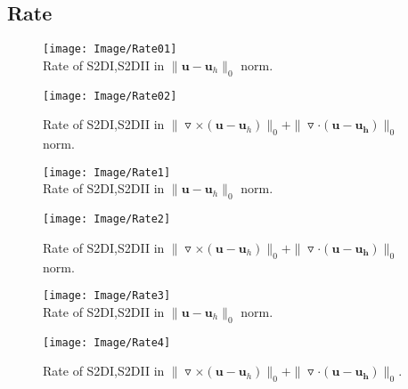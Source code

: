\documentclass[a4paper,11pt]{article}
\begin{document}
\subsection{Rate}
\begin{figure}[bhpt]
  \hspace{35.pt}
  \begin{minipage}[t]{0.4 \textwidth}
    \centering
    \texttt{[image: Image/Rate01]}\\
    \caption{Rate of S2DI,S2DII in $\|\mathbf{u} - \mathbf{u}_h\|_0$ norm.}\label{fig:fig_Rate01}
  \end{minipage}
  \hspace{0.3in}
  \begin{minipage}[t]{0.4 \textwidth}
    \centering
    \texttt{[image: Image/Rate02]}\\
    \caption{Rate of S2DI,S2DII in $\|\triangledown\times(\mathbf{u} - \mathbf{u}_h)\|_0 + \|\triangledown\cdot(\mathbf{u} - \mathbf{u_h})\|_0$ norm.} \label{fig:fig_Rate02}
  \end{minipage}
\end{figure}
\begin{figure}[bhpt]
  \hspace{35.pt}
  \begin{minipage}[t]{0.4 \textwidth}
    \centering
    \texttt{[image: Image/Rate1]}\\
    \caption{Rate of S2DI,S2DII in $\|\mathbf{u} - \mathbf{u}_h\|_0$ norm.}\label{fig:fig_Rate1}
  \end{minipage}
  \hspace{0.3in}
  \begin{minipage}[t]{0.4 \textwidth}
    \centering
    \texttt{[image: Image/Rate2]}\\
    \caption{Rate of S2DI,S2DII in $\|\triangledown\times(\mathbf{u} - \mathbf{u}_h)\|_0 + \|\triangledown\cdot(\mathbf{u} - \mathbf{u_h})\|_0$ norm.} \label{fig:fig_Rate2}
  \end{minipage}
\end{figure}
\begin{figure}[bhpt]
  \hspace{35.pt}
  \begin{minipage}[t]{0.4 \textwidth}
    \centering
    \texttt{[image: Image/Rate3]}\\
    \caption{Rate of S2DI,S2DII in $\|\mathbf{u} - \mathbf{u}_h\|_0$ norm.}\label{fig:fig_Rate3}
  \end{minipage}
  \hspace{0.3in}
  \begin{minipage}[t]{0.4 \textwidth}
    \centering
    \texttt{[image: Image/Rate4]}\\
    \caption{Rate of S2DI,S2DII in $\|\triangledown\times(\mathbf{u} - \mathbf{u}_h)\|_0 + \|\triangledown\cdot(\mathbf{u} - \mathbf{u_h})\|_0$.} \label{fig:fig_Rate4}
  \end{minipage}
\end{figure}
\end{document}
